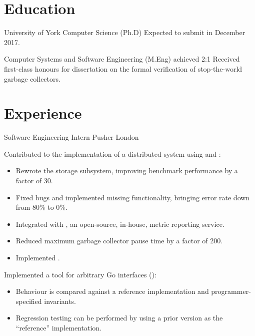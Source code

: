 \documentclass[a4paper]{barrucadu-cv}
\begin{document}
\section{Education}

\begin{educated}{University of York}
  {Computer Science (Ph.D)}
  {}
  {Expected to submit in December 2017.}

  {Computer Systems and Software Engineering (M.Eng)}
  {achieved 2:1}
  {Received first-class honours for dissertation on the formal
    verification of stop-the-world garbage collectors.}
\end{educated}

\section{Experience}

  {Software Engineering Intern}
  {Pusher}
  {London}
  {\begin{tightitemize}
    \item Contributed to the implementation of a distributed system
      using  and :
      \begin{itemize}
      \item Rewrote the storage subsystem, improving benchmark
        performance by a factor of 30.
      \item Fixed bugs and implemented missing functionality, bringing
        error rate down from 80\% to 0\%.
      \item Integrated with , an open-source,
        in-house, metric reporting service.
      \item Reduced maximum garbage collector pause time by a factor
        of 200.
        \item Implemented .
      \end{itemize}
    \item Implemented a tool for  arbitrary Go
      interfaces (\textbf{}):
      \begin{itemize}
      \item Behaviour is compared against a reference implementation
        and programmer-specified invariants.
      \item Regression testing can be performed by using a prior
        version as the ``reference'' implementation.
      \end{itemize}
    \end{tightitemize}}
\end{document}
